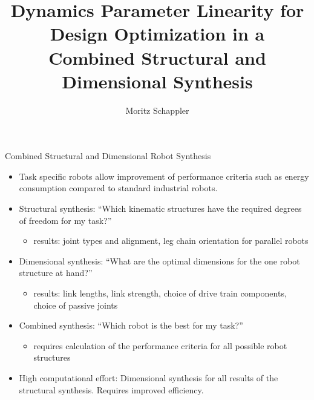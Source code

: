 \documentclass[c]{beamer}
\author[moritz.schappler@imes.uni-hannover.de]{Moritz Schappler}
\title{Dynamics Parameter Linearity for Design Optimization in a Combined Structural and Dimensional Synthesis}
\institute{Institute of Mechatronic Systems}
\newcommand{\postersubsection}[1]{%
\setlength\fboxsep{0pt}%
\vfil\penalty125\vfilneg\vskip1.5ex
\colorbox{Grau}{\parbox[b]{\columnwidth}{\vskip0.75ex%
\Large\hskip1ex #1%
\vskip0.75ex}}%
}
\begin{document}
\begin{frame}
\begin{block}{Combined Structural and Dimensional Robot Synthesis}
\parbox{\linewidth}{
\begin{multicols}{2}
\begin{itemize}
    \item Task specific robots allow improvement of performance criteria such as energy consumption compared to standard industrial robots.
    \item Structural synthesis: ``Which kinematic structures have the required degrees of freedom for my task?'' 
    \begin{itemize}
    \item results: joint types and alignment, leg chain orientation for parallel robots
    \end{itemize}
    \item Dimensional synthesis: ``What are the optimal dimensions for the one robot structure at hand?'' 
    \begin{itemize}
        \item results: link lengths, link strength, choice of drive train components, choice of passive joints
    \end{itemize}
    \item Combined synthesis: ``Which robot is the best for my task?''
    \begin{itemize}
        \item requires calculation of the performance criteria for all possible robot structures
    \end{itemize}
    \item High computational effort: Dimensional synthesis for all results of the structural synthesis. Requires improved efficiency.
\end{itemize}

\begin{figure}[t]
    \centering
	
\end{figure}



\end{multicols}}
\end{block}
\end{frame}
\end{document}
